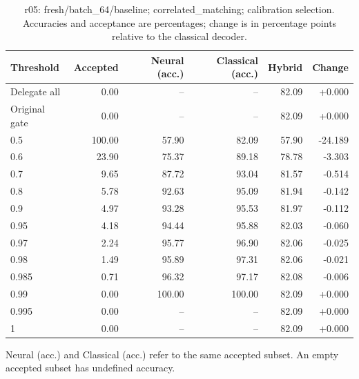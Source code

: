 \begin{table}[htbp]
\centering\small
\setlength{\tabcolsep}{3pt}
\caption{r05: fresh/batch\_64/baseline; correlated\_matching; calibration selection. Accuracies and acceptance are percentages; change is in percentage points relative to the classical decoder.}
\begin{tabular}{lrrrrr}
\toprule
Threshold & Accepted & Neural (acc.) & Classical (acc.) & Hybrid & Change \\
\midrule
Delegate all & 0.00 & -- & -- & 82.09 & +0.000 \\
Original gate & 0.00 & -- & -- & 82.09 & +0.000 \\
0.5 & 100.00 & 57.90 & 82.09 & 57.90 & -24.189 \\
0.6 & 23.90 & 75.37 & 89.18 & 78.78 & -3.303 \\
0.7 & 9.65 & 87.72 & 93.04 & 81.57 & -0.514 \\
0.8 & 5.78 & 92.63 & 95.09 & 81.94 & -0.142 \\
0.9 & 4.97 & 93.28 & 95.53 & 81.97 & -0.112 \\
0.95 & 4.18 & 94.44 & 95.88 & 82.03 & -0.060 \\
0.97 & 2.24 & 95.77 & 96.90 & 82.06 & -0.025 \\
0.98 & 1.49 & 95.89 & 97.31 & 82.06 & -0.021 \\
0.985 & 0.71 & 96.32 & 97.17 & 82.08 & -0.006 \\
0.99 & 0.00 & 100.00 & 100.00 & 82.09 & +0.000 \\
0.995 & 0.00 & -- & -- & 82.09 & +0.000 \\
1 & 0.00 & -- & -- & 82.09 & +0.000 \\
\bottomrule
\end{tabular}
\par\smallskip\footnotesize Neural (acc.) and Classical (acc.) refer to the same accepted subset. An empty accepted subset has undefined accuracy.
\end{table}
